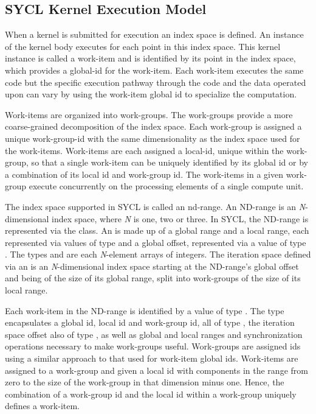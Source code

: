 \subsection{SYCL Kernel Execution Model}

When a kernel is submitted for execution an index space is defined.
An instance of the kernel body executes for each point in this index space.
This kernel instance is called a \gls{work-item} and is identified by its
point in the index space, which provides a \gls{global-id} for the work-item.  Each
work-item executes the same code but the specific execution pathway through the
code and the data operated upon can vary by using the work-item global id to
specialize the computation.

Work-items are organized into work-groups. The \glspl{work-group} provide a more
coarse-grained decomposition of the index space.  Each work-group is assigned a
unique \gls{work-group-id} with the same dimensionality as the index space used for
the work-items. Work-items are each assigned a \gls{local-id}, unique within the
work-group, so that a single work-item can be uniquely identified by its global
id or by a combination of its local id and work-group id.  The work-items in a
given work-group execute concurrently on the processing elements of a single
compute unit.

The index space supported in SYCL is called an \gls{nd-range}.  An ND-range is an
\textit{N}-dimensional index space, where \textit{N} is one, two or three.  In
SYCL, the ND-range is represented via the  class.  An
 is made up of a global range and a local range, each
represented via values of type  and a global offset,
represented via a value of type .  The types
 and  are each \textit{N}-element
arrays of integers.  The iteration space defined via an 
is an \textit{N}-dimensional index space starting at the ND-range's global
offset and being of the size of its global range, split into work-groups of the
size of its local range.

Each work-item in the ND-range is identified by a value of type
.  The type  encapsulates a
global id, local id and work-group id, all of type ,
the iteration space offset also of type , as well as
global and local ranges and synchronization operations necessary to
make work-groups useful. Work-groups are assigned ids using a similar
approach to that used for work-item global ids.  Work-items are
assigned to a work-group and given a local id with components in the
range from zero to the size of the work-group in that dimension minus
one.  Hence, the combination of a work-group id and the local id
within a work-group uniquely defines a work-item.

